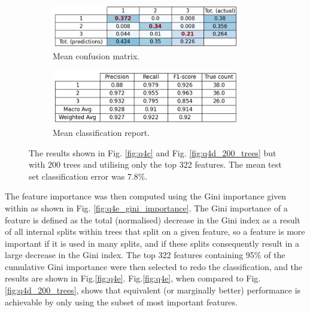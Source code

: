     \begin{figure}[htb]
    \centering
    \begin{subfigure}{0.5\textwidth}
        \centering
        \includegraphics[width=0.9\textwidth]{./figures/q4e_confusion_matrix}
        \caption{Mean confusion matrix.}
        \label{fig:q4e_confusion_matrix}
    \end{subfigure}%
    \begin{subfigure}{0.5\textwidth}
        \centering
        \includegraphics[width=0.9\textwidth]{./figures/q4e_classification_report}
        \caption{Mean classification report.}
        \label{fig:q4e_classification_report}
    \end{subfigure}
    \caption{The results shown in Fig. \eqref{fig:q4c} and Fig. \eqref{fig:q4d_200_trees} but with 200 trees and
        utilising only the top 322 features. The mean test set classification error was 7.8\%.}
    \label{fig:q4e}
    \end{figure}

    The feature importance was then computed using the Gini importance given within
     as shown in Fig. \eqref{fig:q4e_gini_importance}.
    The Gini importance of a feature is defined as the total (normalised) decrease in the Gini index as a result of all
    internal splits within trees that split on a given feature, so a feature is more important if it is used in many
    splits, and if these splits consequently result in a large decrease in the Gini index.
    The top 322 features containing 95\% of the cumulative Gini importance were then selected to redo the classification,
    and the results are shown in Fig.\eqref{fig:q4e}.
    Fig.\eqref{fig:q4e}, when compared to Fig.\eqref{fig:q4d_200_trees}, shows that equivalent (or marginally better)
    performance is achievable by only using the subset of most important features.

